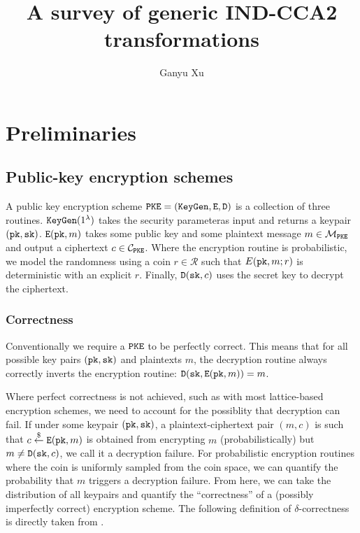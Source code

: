 \documentclass{article}
\title{
    A survey of generic IND-CCA2 transformations
}
\author{
    Ganyu Xu
}
\begin{document}
\maketitle

\section{Preliminaries}
\subsection{Public-key encryption schemes}
A public key encryption scheme $\texttt{PKE} = (\texttt{KeyGen}, \texttt{E}, \texttt{D})$ is a collection of three routines. $\texttt{KeyGen}(1^\lambda)$ takes the security parameteras input and returns a keypair $(\texttt{pk}, \texttt{sk})$. $\texttt{E}(\texttt{pk}, m)$ takes some public key and some plaintext message $m \in \mathcal{M}_\texttt{PKE}$ and output a ciphertext $c \in \mathcal{C}_\texttt{PKE}$. Where the encryption routine is probabilistic, we model the randomness using a coin $r \in \mathcal{R}$ such that $E(\texttt{pk}, m; r)$ is deterministic with an explicit $r$. Finally, $\texttt{D}(\texttt{sk}, c)$ uses the secret key to decrypt the ciphertext.

\subsubsection{Correctness}
Conventionally we require a $\texttt{PKE}$ to be perfectly correct. This means that for all possible key pairs $(\texttt{pk}, \texttt{sk})$ and plaintexts $m$, the decryption routine always correctly inverts the encryption routine: $\texttt{D}(\texttt{sk}, \texttt{E}(\texttt{pk}, m)) = m$.

Where perfect correctness is not achieved, such as with most lattice-based encryption schemes, we need to account for the possiblity that decryption can fail. If under some keypair $(\texttt{pk}, \texttt{sk})$, a plaintext-ciphertext pair $(m, c)$ is such that $c \stackrel{\$}{\leftarrow} \texttt{E}(\texttt{pk}, m)$ is obtained from encrypting $m$ (probabilistically) but $m \neq \texttt{D}(\texttt{sk}, c)$, we call it a decryption failure. For probabilistic encryption routines where the coin is uniformly sampled from the coin space, we can quantify the probability that $m$ triggers a decryption failure. From here, we can take the distribution of all keypairs and quantify the ``correctness'' of a (possibly imperfectly correct) encryption scheme. The following definition of $\delta$-correctness is directly taken from \cite{bos2018crystals}.
\end{document}
